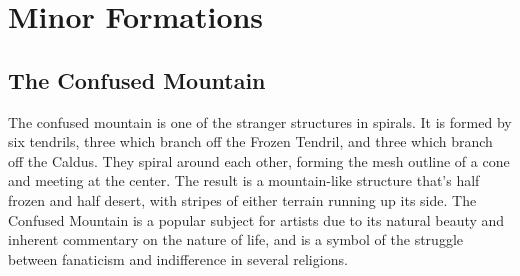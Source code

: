 \chapter{Minor Formations}


\section{The Confused Mountain}
The confused mountain is one of the stranger structures in spirals.
It is formed by six tendrils, three which branch off the Frozen Tendril, and three which branch off the Caldus.
They spiral around each other, forming the mesh outline of a cone and meeting at the center.
The result is a mountain-like structure that's half frozen and half desert, with stripes of either terrain running up its side.
The Confused Mountain is a popular subject for artists due to its natural beauty and inherent commentary on the nature of life, and is a symbol of the struggle between fanaticism and indifference in several religions.